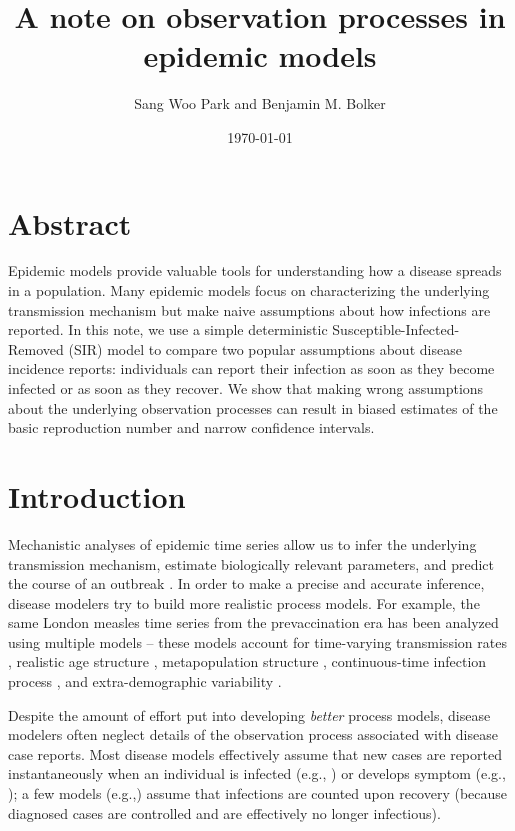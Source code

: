 \documentclass{article}\usepackage[]{graphicx}\usepackage[]{color}
\title{A note on observation processes in epidemic models}
\author{Sang Woo Park and Benjamin M. Bolker}
\date{\today}
\begin{document}
\maketitle

\section*{Abstract}

Epidemic models provide valuable tools for understanding how a disease
spreads in a population. Many epidemic models focus on characterizing
the underlying transmission mechanism but make naive assumptions about
how infections are reported. In this note, we use a simple deterministic
Susceptible-Infected-Removed (SIR) model to compare two popular assumptions 
about disease incidence reports: individuals can report their infection as soon as
they become infected or as soon as they recover. We show that making
wrong assumptions about the underlying observation processes can result
in biased estimates of the basic reproduction number and narrow confidence
intervals.

\section{Introduction}

Mechanistic analyses of epidemic time series allow us to infer the underlying 
transmission mechanism, estimate biologically relevant parameters, and 
predict the course of an outbreak \citep{breto2009time}. In order to make a 
precise and accurate inference, disease modelers try to build
more realistic process models. For example, the same London measles time 
series from the prevaccination era has been analyzed using multiple models -- 
these models account for time-varying transmission rates \citep{fine1982measles}, 
realistic age structure \citep{schenzle1984age},
metapopulation structure \citep{xia2004measles}, continuous-time infection process 
\citep{cauchemez2008likelihood}, and extra-demographic variability \citep{he2009plug}. 

Despite the amount of effort put into developing \emph{better} process models, disease 
modelers often neglect details of the observation process associated with disease
case reports. Most disease models effectively assume that new cases are reported
instantaneously when an individual is infected (e.g., \cite{martinez2016differential, 
kennedy2018modeling, pons2018serotype}) or develops symptom (e.g., 
\cite{bhadra2011malaria, king2015avoidable}); 
a few models (e.g.,\cite{breto2009time, he2009plug, lin2016seasonality})
assume that infections are counted upon recovery (because diagnosed cases
are controlled and are effectively no longer infectious). 
\end{document}
